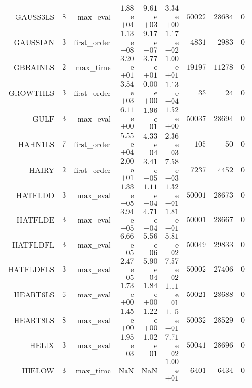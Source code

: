 \begin{longtable}{rrrrrrrrr}
GAUSS3LS & \(     8\) & max\_eval & \( 1.88\)e\(+04\) & \( 9.61\)e\(+03\) & \( 3.34\)e\(+00\) & \( 50022\) & \( 28684\) & \(     0\) \\
GAUSSIAN & \(     3\) & first\_order & \( 1.13\)e\(-08\) & \( 9.17\)e\(-07\) & \( 1.17\)e\(-02\) & \(  4831\) & \(  2983\) & \(     0\) \\
GBRAINLS & \(     2\) & max\_time & \( 3.20\)e\(+01\) & \( 3.77\)e\(+01\) & \( 1.00\)e\(+01\) & \( 19197\) & \( 11278\) & \(     0\) \\
GROWTHLS & \(     3\) & first\_order & \( 3.54\)e\(+03\) & \( 0.00\)e\(+00\) & \( 1.13\)e\(-04\) & \(    33\) & \(    24\) & \(     0\) \\
GULF & \(     3\) & max\_eval & \( 6.11\)e\(+00\) & \( 1.96\)e\(-01\) & \( 1.52\)e\(+00\) & \( 50037\) & \( 28694\) & \(     0\) \\
HAHN1LS & \(     7\) & first\_order & \( 5.55\)e\(+04\) & \( 4.33\)e\(-04\) & \( 2.36\)e\(-03\) & \(   105\) & \(    50\) & \(     0\) \\
HAIRY & \(     2\) & first\_order & \( 2.00\)e\(+01\) & \( 3.41\)e\(-05\) & \( 7.58\)e\(-03\) & \(  7237\) & \(  4452\) & \(     0\) \\
HATFLDD & \(     3\) & max\_eval & \( 1.33\)e\(-05\) & \( 1.11\)e\(-04\) & \( 1.32\)e\(-01\) & \( 50001\) & \( 28673\) & \(     0\) \\
HATFLDE & \(     3\) & max\_eval & \( 3.94\)e\(-05\) & \( 4.71\)e\(-04\) & \( 1.81\)e\(-01\) & \( 50001\) & \( 28667\) & \(     0\) \\
HATFLDFL & \(     3\) & max\_eval & \( 6.66\)e\(-05\) & \( 5.56\)e\(-06\) & \( 5.81\)e\(-02\) & \( 50049\) & \( 29833\) & \(     0\) \\
HATFLDFLS & \(     3\) & max\_eval & \( 2.47\)e\(-05\) & \( 5.90\)e\(-04\) & \( 7.57\)e\(-02\) & \( 50002\) & \( 27406\) & \(     0\) \\
HEART6LS & \(     6\) & max\_eval & \( 1.73\)e\(+00\) & \( 1.84\)e\(+00\) & \( 1.11\)e\(-01\) & \( 50021\) & \( 28688\) & \(     0\) \\
HEART8LS & \(     8\) & max\_eval & \( 1.45\)e\(+00\) & \( 1.22\)e\(+00\) & \( 1.15\)e\(-01\) & \( 50032\) & \( 28529\) & \(     0\) \\
HELIX & \(     3\) & max\_eval & \( 1.95\)e\(-03\) & \( 1.02\)e\(-01\) & \( 7.71\)e\(-02\) & \( 50041\) & \( 28696\) & \(     0\) \\
HIELOW & \(     3\) & max\_time &       NaN &       NaN & \( 1.00\)e\(+01\) & \(  6401\) & \(  6434\) & \(     0\) \\

\end{longtable}
